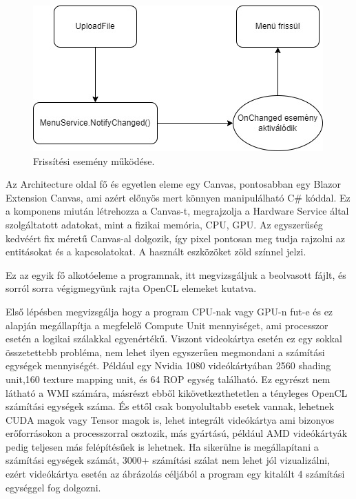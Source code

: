 \begin{figure}[h]
\centering
\includegraphics[scale=0.5]{images/MenuS.jpg}
\caption{Frissítési esemény működése.}
\label{fig:MenuEvent}
\end{figure}

Az Architecture oldal fő és egyetlen eleme egy Canvas, pontosabban egy Blazor Extension Canvas, ami azért előnyös mert könnyen manipulálható C\# kóddal. Ez a komponens miután létrehozza a Canvas-t, megrajzolja a Hardware Service által szolgáltatott adatokat, mint a fizikai memória, CPU, GPU. Az egyszerűség kedvéért fix méretű Canvas-al dolgozik, így pixel pontosan meg tudja rajzolni az entitásokat és a kapcsolatokat. A használt eszközöket zöld színnel jelzi.

Ez az egyik fő alkotóeleme a programnak, itt megvizsgáljuk a beolvasott fájlt, és sorról sorra végigmegyünk rajta OpenCL elemeket kutatva. 

Első lépésben megvizsgálja hogy a program CPU-nak vagy GPU-n fut-e és ez alapján megállapítja a megfelelő Compute Unit mennyiséget, ami processzor esetén a logikai szálakkal egyenértékű. Viszont videokártya esetén ez egy sokkal összetettebb probléma, nem lehet ilyen egyszerűen megmondani a számítási egységek mennyiségét. Például egy Nvidia 1080 videókártyában 2560 shading unit,160 texture mapping unit, és 64 ROP egység található. Ez egyrészt nem látható a WMI számára, másrészt ebből kikövetkezthetetlen a tényleges OpenCL számítási egységek száma. És ettől csak bonyolultabb esetek vannak, lehetnek CUDA magok vagy Tensor magok is, lehet integrált videókártya ami bizonyos erőforrásokon a processzorral osztozik, más gyártású, például AMD videókártyák pedig teljesen más felépítésűek is lehetnek. Ha sikerülne is megállapítani a számítási egységek számát, 3000+ számítási szálat nem lehet jól vizualizálni, ezért videókártya esetén az ábrázolás céljából a program egy kitalált 4 számítási egységgel fog dolgozni.

